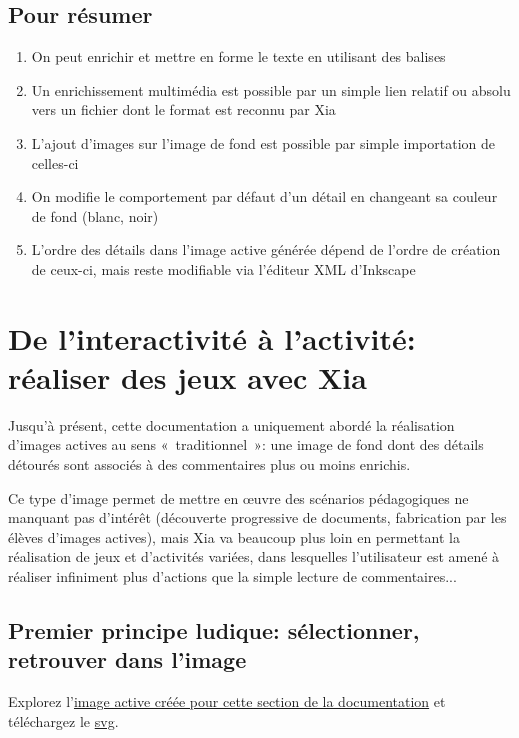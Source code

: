 {\subsection{Pour résumer}

\begin{enumerate}
 \item On peut enrichir et mettre en forme le texte en utilisant des balises
 \item Un enrichissement multimédia est possible par un simple lien relatif ou absolu vers un fichier 
 dont le format est reconnu par Xia
 \item L'ajout d'images sur l'image de fond est possible par simple importation de celles-ci
 \item On modifie le comportement par défaut d'un détail en changeant sa couleur de fond (blanc, noir)
 \item L'ordre des détails dans l'image active générée dépend de l'ordre de création de ceux-ci, 
 mais reste modifiable via l'éditeur XML d'Inkscape
\end{enumerate}


\section{De l'interactivité à l'activité: réaliser des jeux avec Xia}

Jusqu'à présent, cette documentation a uniquement abordé la réalisation d'images actives au sens «~traditionnel~»:
une image de fond dont des détails détourés sont associés à des commentaires plus ou moins enrichis.

Ce type d'image permet de mettre en œuvre des scénarios pédagogiques ne manquant pas d'intérêt 
(découverte progressive de documents, fabrication par les élèves d'images actives), 
mais Xia va beaucoup plus loin en permettant la réalisation de jeux et d'activités variées, dans lesquelles
l'utilisateur est amené à réaliser infiniment plus d'actions que la simple lecture
 de commentaires...

\subsection{Premier principe ludique: sélectionner, retrouver dans l'image}

Explorez l'\href{http://geoffrey-gekiere.ac-versailles.fr/xia3}{image active créée pour cette section de la documentation} 
et téléchargez le \href{http://geoffrey-gekiere.ac-versailles.fr/xia3/svg/xia3.svg}{svg}.

}
